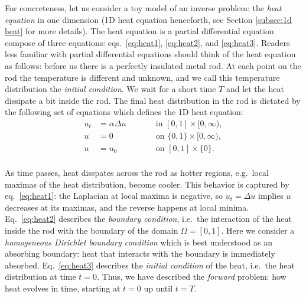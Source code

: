 
For concreteness, let us consider a toy model of an inverse problem:
the \emph{heat equation} in one dimension (1D heat equation
henceforth, see Section \ref{subsec:1d heat} for more details). The
heat equation is a partial differential equation compose of three
equations: eqs.~\eqref{eq:heat1}, \eqref{eq:heat2}, and
\eqref{eq:heat3}. Readers less familiar with partial differential
equations should think of the heat equation as follows: before us
there is a perfectly insulated metal rod. At each point on the rod the
temperature is different and unknown, and we call this temperature
distribution the \emph{initial condition}. We wait for a short time
$T$ and let the heat dissipate a bit inside the rod. The final heat
distribution in the rod is dictated by the following set of equations
which defines the 1D heat equation:
\begin{subequations}%
  \begin{alignat}{2}
    u_t &= \alpha \Delta u &&\qquad \text{in } [0,1] \times [0,\infty), \label{eq:heat1}\\
    u &= 0 &&\qquad \text{on } \{0, 1\} \times [0,\infty), \label{eq:heat2}\\
    u &= u_0 &&\qquad \text{on }[0,1] \times \{0\}. \label{eq:heat3}\\
  \end{alignat}
\end{subequations}

As time passes, heat disspates across the rod as hotter regions,
e.g.~local maximas of the heat distribution, become cooler. This
behavior is captured by eq.~\eqref{eq:heat1}: the Laplacian at local
maxima is negative, so $u_t = \Delta u$ implies $u$ decreases at its
maximas, and the reverse happens at local minima. Eq.~\eqref{eq:heat2}
describes the \emph{boundary condition}, i.e.~the interaction of the
heat inside the rod with the boundary of the domain $\Omega =
[0,1]$. Here we consider a \emph{homogeneous Dirichlet boundary
condition} which is best understood as an absorbing boundary: heat
that interacts with the boundary is immediately
absorbed. Eq.~\eqref{eq:heat3} describes the \emph{initial condition}
of the heat, i.e.~the heat distribution at time $t=0$. Thus, we have
described the \emph{forward} problem: how heat evolves in time,
starting at $t=0$ up until $t=T$.


